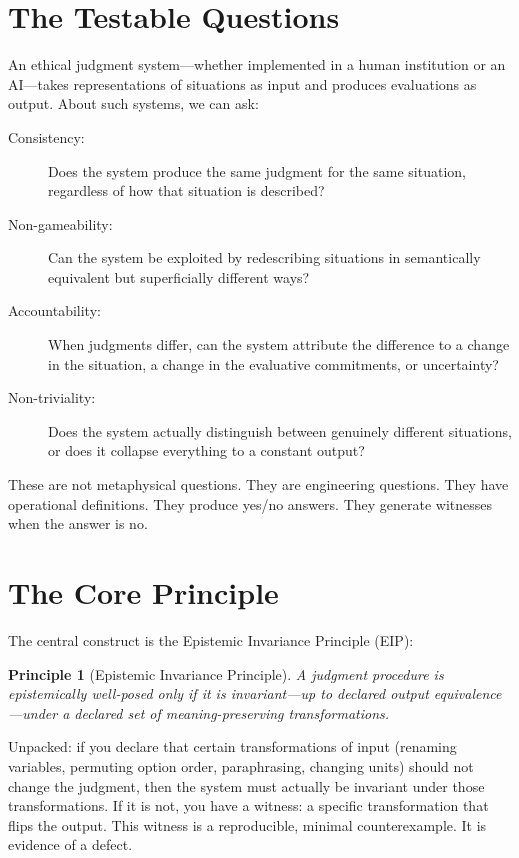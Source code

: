 \documentclass[12pt]{article}
\newtheorem{principle}{Principle}
\begin{document}
\section{The Testable Questions}

An ethical judgment system---whether implemented in a human institution or an
AI---takes representations of situations as input and produces evaluations as output.
About such systems, we can ask:

\begin{description}
  \item[Consistency:] Does the system produce the same judgment for the same
    situation, regardless of how that situation is described?
  \item[Non-gameability:] Can the system be exploited by redescribing situations in
    semantically equivalent but superficially different ways?
  \item[Accountability:] When judgments differ, can the system attribute the
    difference to a change in the situation, a change in the evaluative
    commitments, or uncertainty?
  \item[Non-triviality:] Does the system actually distinguish between genuinely
    different situations, or does it collapse everything to a constant output?
\end{description}

These are not metaphysical questions. They are engineering questions. They have
operational definitions. They produce yes/no answers. They generate witnesses when
the answer is no.

\section{The Core Principle}

The central construct is the Epistemic Invariance Principle (EIP):

\begin{principle}[Epistemic Invariance Principle]
A judgment procedure is epistemically well-posed only if it is
invariant---up to declared output equivalence---under a declared set of
meaning-preserving transformations.
\end{principle}

Unpacked: if you declare that certain transformations of input (renaming variables,
permuting option order, paraphrasing, changing units) should not change the
judgment, then the system must actually be invariant under those transformations. If
it is not, you have a witness: a specific transformation that flips the output. This
witness is a reproducible, minimal counterexample. It is evidence of a defect.
\end{document}
